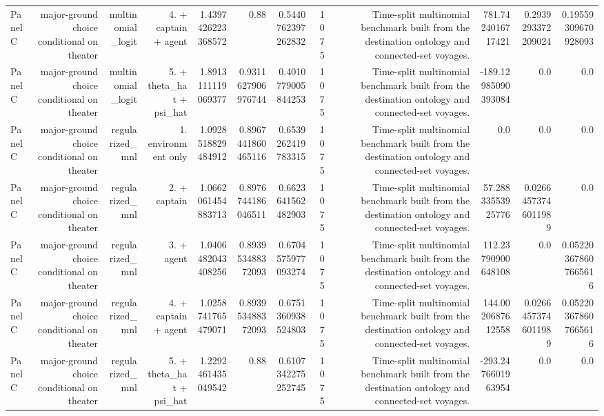 \documentclass{article}
\begin{document}
\begin{tabular}{lrrrrrrrrrrr}
Panel C & major-ground choice conditional on theater & multinomial\_logit & 4. + captain + agent & 1.4397426223368572 & 0.88 & 0.5440762397262832 & 1075 & Time-split multinomial benchmark built from the destination ontology and connected-set voyages. & 781.7424016717421 & 0.2939293372209024 & 0.19559309670928093 \\
Panel C & major-ground choice conditional on theater & multinomial\_logit & 5. + theta\_hat + psi\_hat & 1.8913111119069377 & 0.9311627906976744 & 0.4010779005844253 & 1075 & Time-split multinomial benchmark built from the destination ontology and connected-set voyages. & -189.12985090393084 & 0.0 & 0.0 \\
Panel C & major-ground choice conditional on theater & regularized\_mnl & 1. environment only & 1.0928518829484912 & 0.8967441860465116 & 0.6539262419783315 & 1075 & Time-split multinomial benchmark built from the destination ontology and connected-set voyages. & 0.0 & 0.0 & 0.0 \\
Panel C & major-ground choice conditional on theater & regularized\_mnl & 2. + captain & 1.0662061454883713 & 0.8976744186046511 & 0.6623641562482903 & 1075 & Time-split multinomial benchmark built from the destination ontology and connected-set voyages. & 57.28833553925776 & 0.02664573746011989 & 0.0 \\
Panel C & major-ground choice conditional on theater & regularized\_mnl & 3. + agent & 1.0406482043408256 & 0.893953488372093 & 0.6704575977093274 & 1075 & Time-split multinomial benchmark built from the destination ontology and connected-set voyages. & 112.23790900648108 & 0.0 & 0.052203678607665616 \\
Panel C & major-ground choice conditional on theater & regularized\_mnl & 4. + captain + agent & 1.0258741765479071 & 0.893953488372093 & 0.6751360938524803 & 1075 & Time-split multinomial benchmark built from the destination ontology and connected-set voyages. & 144.0020687612558 & 0.02664573746011989 & 0.052203678607665616 \\
Panel C & major-ground choice conditional on theater & regularized\_mnl & 5. + theta\_hat + psi\_hat & 1.2292461435049542 & 0.88 & 0.6107342275252745 & 1075 & Time-split multinomial benchmark built from the destination ontology and connected-set voyages. & -293.2476601963954 & 0.0 & 0.0 \\
\hline
\end{tabular}
\end{document}
